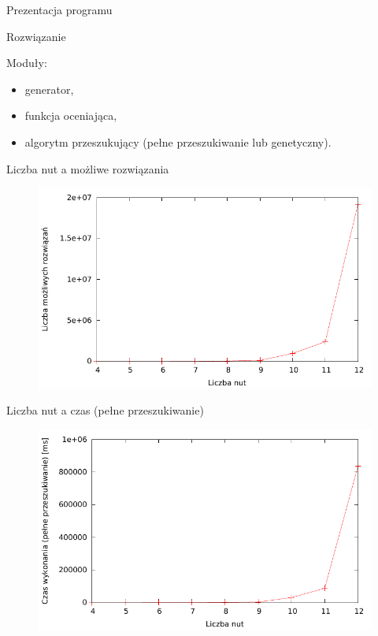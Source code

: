 \documentclass{beamer}
\begin{document}
\begin{frame}{Prezentacja programu}
\end{frame}

\begin{frame}{Rozwiązanie}

Moduły:
\begin{itemize}
\item generator,
\item funkcja oceniająca,
\item algorytm przeszukujący (pełne przeszukiwanie lub genetyczny).
\end{itemize}

\end{frame}

\begin{frame}{Liczba nut a możliwe rozwiązania}
	\begin{figure}
	   \includegraphics[scale=0.7]{images/liczba_nut_a_mozliwe_rozwiazania.pdf}
	\end{figure}
\end{frame}

\begin{frame}{Liczba nut a czas (pełne przeszukiwanie)}
	\begin{figure}
	   \includegraphics[scale=0.7]{images/liczba_nut_a_czas_FS.pdf}
	\end{figure}
\end{frame}
\end{document}
